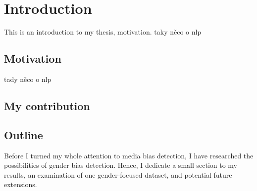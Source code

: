 \chapter{Introduction}
This is an introduction to my thesis, motivation. taky něco o nlp
\section{Motivation}
tady něco o nlp
\section{My contribution}
\section{Outline}
Before I turned my whole attention to media bias detection, I have researched the possibilities of gender bias detection. Hence, I dedicate a small section to my results, an examination of one gender-focused dataset, and potential future extensions.
